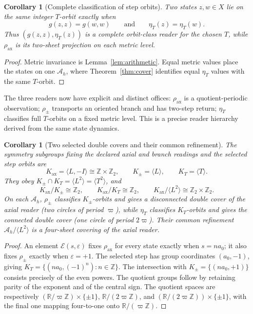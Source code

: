 \documentclass[10pt,letterpaper]{article}
\newtheorem{corollary}[theorem]{Corollary}
\theoremstyle{definition}\newtheorem{definition}[theorem]{Definition}
\newcommand{\RR}{\mathbb R}
\newcommand{\ZZ}{\mathbb Z}
\newcommand{\eps}{\varepsilon}
\newcommand{\Ah}{\mathcal A_h}
\newcommand{\varp}{\varpi}
\newcommand{\rhoax}{\rho_{\mathrm{ax}}}
\newcommand{\rhos}{\rho_{\pm}}
\newcommand{\etaT}{\eta_T}
\begin{document}
\begin{corollary}[Complete classification of step orbits]\label{cor:orbits}
Two states $z,w\in X$ lie on the same integer $T$-orbit exactly when
\begin{equation}
 g(z,z)=g(w,w)\qquad\text{and}\qquad\etaT(z)=\etaT(w).
\end{equation}
Thus $(g(z,z),\etaT(z))$ is a complete orbit-class reader for the chosen $T$, while $\rhoax$ is its two-sheet projection on each metric level.
\end{corollary}
\begin{proof}
Metric invariance is Lemma~\ref{lem:arithmetic}. Equal metric values place the states on one $\Ah$, where Theorem~\ref{thm:cover} identifies equal $\etaT$ values with the same $T$-orbit.
\end{proof}

The three readers now have explicit and distinct offices: $\rhoax$ is a quotient-periodic observation; $\rhos$ transports an oriented branch and has two-step return; $\etaT$ classifies full $T$-orbits on a fixed metric level. This is a precise reader hierarchy derived from the same state dynamics.

\begin{corollary}[Two selected double covers and their common refinement]\label{cor:diamond}
The symmetry subgroups fixing the declared axial and branch readings and the selected step orbits are
\begin{equation}
 K_{\mathrm{ax}}=\langle L,-I\rangle\cong\ZZ\times\mathbb Z_2,\qquad
 K_{\pm}=\langle L\rangle,\qquad K_T=\langle T\rangle.
\end{equation}
They obey $K_{\pm}\cap K_T=\langle L^2\rangle=\langle T^2\rangle$, and
\begin{equation}\label{eq:diamond}
 K_{\mathrm{ax}}/K_{\pm}\cong\mathbb Z_2,\qquad
 K_{\mathrm{ax}}/K_T\cong\mathbb Z_2,\qquad
 K_{\mathrm{ax}}/\langle L^2\rangle\cong\mathbb Z_2\times\mathbb Z_2.
\end{equation}
On each $\mathcal A_h$, $\rho_{\pm}$ classifies $K_{\pm}$-orbits and gives a \emph{disconnected} double cover of the axial reader (two circles of period $\varp$), while $\eta_T$ classifies $K_T$-orbits and gives the \emph{connected} double cover (one circle of period $2\varp$). Their common refinement $\mathcal A_h/\langle L^2\rangle$ is a four-sheet covering of the axial reader.
\end{corollary}
\begin{proof}
An element $\mathcal E(s,\eps)$ fixes $\rhoax$ for every state exactly when $s=na_0$; it also fixes $\rhos$ exactly when $\eps=+1$. The selected step has group coordinates $(a_0,-1)$, giving $K_T=\{(na_0,(-1)^n):n\in\ZZ\}$. The intersection with $K_{\pm}=\{(na_0,+1)\}$ consists precisely of the even powers. The quotient groups follow by retaining parity of the exponent and of the central sign. The quotient spaces are respectively $(\RR/\varp\ZZ)\times\{\pm1\}$, $\RR/(2\varp\ZZ)$, and $(\RR/(2\varp\ZZ))\times\{\pm1\}$, with the final one mapping four-to-one onto $\RR/(\varp\ZZ)$.
\end{proof}
\end{document}
